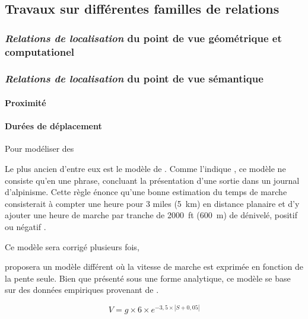 \subsection{Travaux sur différentes familles de relations}

\subsubsection{\emph{Relations de localisation} du point de vue géométrique et
  computationel}

\subsubsection{\emph{Relations de localisation} du point de vue sémantique}

\paragraph{Proximité}

\paragraph{Durées de déplacement}

Pour modéliser des 

Le plus ancien d'entre eux est le modèle de
\textcite{Naismith1892}. Comme l'indique \textcite{Duchene2019}, ce
modèle ne consiste qu'en une phrase, concluant la présentation d'une
sortie dans un journal d'alpinisme. Cette règle énonce qu'une bonne
estimation du temps de marche consisterait à compter une heure pour 3
miles (\SI{5}{\kilo\meter}) en distance planaire et d'y ajouter une
heure de marche par tranche de \SI{2000}{ft} (\SI{600}{\meter}) de
dénivelé, positif ou négatif \autocite{Naismith1892}.

Ce modèle sera corrigé plusieurs fois, 



\textcite{Tobler1993} proposera un modèle différent où la vitesse de
marche est exprimée en fonction de la pente seule. Bien que présenté
sous une forme analytique, ce modèle se base sur des données
empiriques provenant de \textcite{Imhof1950} \autocite{Tobler1993}.

\begin{equation}
  \label{eq:marche_tobler}
  V = g × 6 × e^{-3,5 × \left| S + 0,05 \right|}
\end{equation}

